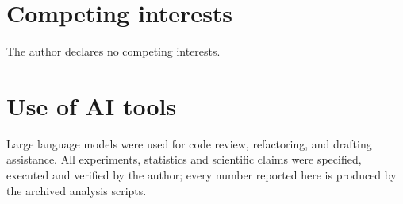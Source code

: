 \documentclass[9pt,lineno]{elife}
\begin{document}
\section*{Competing interests}
The author declares no competing interests.

\section*{Use of AI tools}
Large language models were used for code review, refactoring, and drafting assistance. All
experiments, statistics and scientific claims were specified, executed and verified by the
author; every number reported here is produced by the archived analysis scripts.


\end{document}
